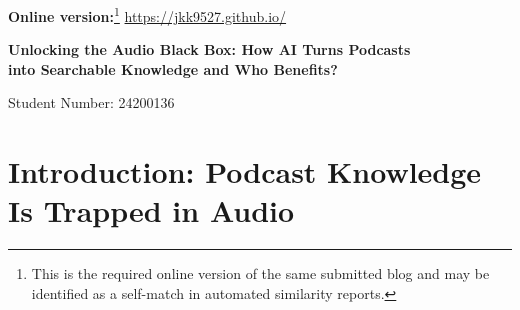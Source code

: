 \documentclass[11pt,a4paper]{article}
\begin{document}
\noindent\textbf{Online version:}\footnote{This is the required online version of the same submitted blog and may be identified as a self-match in automated similarity reports.} \url{https://jkk9527.github.io/}

\vspace{1.2em}

\begin{center}
\begin{minipage}{0.96\textwidth}
\centering
{\fontsize{15.5}{19}\selectfont\bfseries
Unlocking the Audio Black Box: How AI Turns Podcasts \\ into Searchable Knowledge and Who Benefits?\par}
\end{minipage}

\vspace{0.8em}

{\large Student Number: 24200136}\\[0.4em]
\end{center}

\vspace{1em}


\begin{abstract}
As podcasting has moved from a niche audio format into a mainstream channel for interviews, journalism, education, expert analysis and cultural discussion, it has created a paradox: podcasts are increasingly rich in knowledge, but still poor in navigability. Users cannot easily search for a specific idea, skim an episode's structure, cite a precise moment or reuse podcast knowledge without listening linearly. This blog argues that AI can unlock this ``audio black box'' by transforming podcasts from linear audio files into searchable knowledge objects through three steps: transcription makes speech machine-readable and attributable; semantic chunking and vector search make ideas findable; and retrieval-augmented summarisation makes podcast knowledge usable. Yet this transformation creates three ethical risks: AI may misrepresent what was said, shape which creators become visible, and extract value from creators without returning attention or revenue. Responsible podcast AI should therefore be designed as a bridge back to original listening, not as a platform-controlled substitute for it. AI should unlock podcast knowledge, not extract it.
\end{abstract}


\section{Introduction: Podcast Knowledge Is Trapped in Audio}
\end{document}
